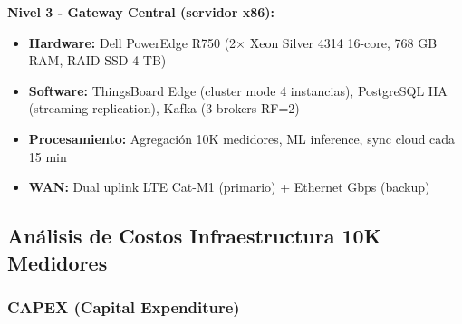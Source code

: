 \textbf{Nivel 3 - Gateway Central (servidor x86):}
\begin{itemize}
\item \textbf{Hardware:} Dell PowerEdge R750 (2$\times$ Xeon Silver 4314 16-core, 768 GB RAM, RAID SSD 4 TB)
\item \textbf{Software:} ThingsBoard Edge (cluster mode 4 instancias), PostgreSQL HA (streaming replication), Kafka (3 brokers RF=2)
\item \textbf{Procesamiento:} Agregación 10K medidores, ML inference, sync cloud cada 15 min
\item \textbf{WAN:} Dual uplink LTE Cat-M1 (primario) + Ethernet Gbps (backup)
\end{itemize}

\subsection{Análisis de Costos Infraestructura 10K Medidores}

\subsubsection{CAPEX (Capital Expenditure)}

